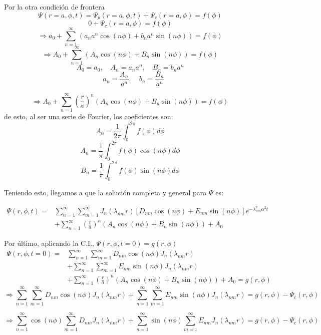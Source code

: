 \documentclass{article}
\begin{document}
Por la otra condición de frontera
$$\Psi(r=a, \phi, t)=\Psi_p(r=a, \phi, t)+\Psi_c(r=a, \phi)=f(\phi)$$
$$0+\Psi_c(r=a, \phi)=f(\phi)$$
$$\Rightarrow a_0+\sum_{n=1}^{\infty} (a_n a^n \cos(n\phi)+b_na^n\sin(n\phi))=f(\phi)$$
$$\Rightarrow A_0+\sum_{n=1}^{\infty} (A_n \cos(n\phi)+B_n\sin(n\phi))=f(\phi)$$
$$ A_0 = a_0, \quad A_n = a_na^n, \quad B_n = b_n a^n$$
$$ \quad a_n = \frac{A_n}{a^n}, \quad b_n = \frac{B_n}{a^n}$$

$$\Rightarrow A_0+\sum_{n=1}^{\infty} \left(\frac{r}{a}\right)^n(A_n \cos(n\phi)+B_n\sin(n\phi))=f(\phi)$$
de esto, al ser una serie de Fourier, los coeficientes son:
$$A_0=\frac{1}{2\pi}\int_0^{2\pi}f(\phi)d\phi$$
$$A_n=\frac{1}{\pi}\int_0^{2\pi} f(\phi)\cos(n\phi)d\phi$$
$$B_n=\frac{1}{\pi}\int_0^{2\pi} f(\phi)\sin(n\phi)d\phi$$

Teniendo esto, llegamos a que la solución completa y general para $\Psi$ es:
\begin{tcolorbox}
\begin{equation}
\begin{split}
\Psi(r,\phi,t)=&\sum_{n=1}^{\infty} \sum_{m=1}^{\infty} J_n(\lambda_{nm}r)[D_{nm}\cos(n\phi) + E_{nm} \sin(n\phi)]e^{-\lambda_{nm}^2 \alpha^2 t}\\
&+\sum_{n=1}^{\infty} \left(\frac{r}{a}\right)^n(A_n \cos(n\phi)+B_n\sin(n\phi))+A_0
\end{split}
\end{equation}
\end{tcolorbox}

Por último, aplicando la C.I., $\Psi(r, \phi, t=0)=g(r, \phi)$
\begin{equation}
\begin{split}
\Psi(r,\phi,t=0)=&\sum_{n=1}^{\infty} \sum_{m=1}^{\infty} D_{nm}\cos(n\phi)J_n(\lambda_{nm}r)\\
&+\sum_{n=1}^{\infty} \sum_{m=1}^{\infty} E_{nm}\sin(n\phi)J_n(\lambda_{nm}r)\\
&+\sum_{n=1}^{\infty} \left(\frac{r}{a}\right)^n (A_n \cos(n\phi)+B_n\sin(n\phi))+A_0=g(r,\phi)
\end{split}
\end{equation}
$$\Rightarrow \sum_{n=1}^{\infty} \sum_{m=1}^{\infty} D_{nm}\cos(n\phi)J_n(\lambda_{nm}r)
+\sum_{n=1}^{\infty} \sum_{m=1}^{\infty} E_{nm}\sin(n\phi)J_n(\lambda_{nm}r)=g(r,\phi)-\Psi_c(r,\phi)$$

$$\Rightarrow \sum_{n=1}^{\infty} \cos(n\phi)\sum_{m=1}^{\infty} D_{nm} J_n(\lambda_{nm}r)
+\sum_{n=1}^{\infty} \sin(n\phi) \sum_{m=1}^{\infty} E_{nm} J_n(\lambda_{nm}r)=g(r,\phi)-\Psi_c(r,\phi)$$
\end{document}
